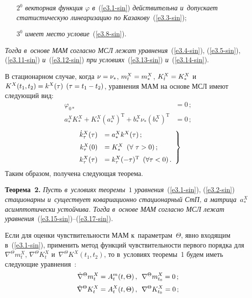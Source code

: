 \begin{multicols}{2}
\begin{itemize}
\item[$2^0$] \textit{векторная функция $\varphi$ в}~(\ref{e3.1-sin}) 
\textit{действительна и~допускает статистическую линеаризацию по 
Казакову}~(\ref{e3.3-sin});

\item[$3^0$] \textit{имеет место условие}~(\ref{e3.8-sin}).
\end{itemize}

\textit{Тогда в~основе МАМ согласно МСЛ лежат уравнения}~(\ref{e3.4-sin}), 
(\ref{e3.5-sin}), (\ref{e3.11-sin}) \textit{и}~(\ref{e3.12-sin}) 
\textit{при условиях}~(\ref{e3.13-sin}) \textit{и}~(\ref{e3.14-sin}).

\smallskip

В стационарном случае, когда $\nu \hm= \nu_*$, $m_t^X\hm= m_*^X$, $K_t^X\hm=K_*^X$ 
и~$K^X(t_1, t_2) \hm= k^X (\tau)$ $(\tau \hm= t_1\hm- t_2)$, уравнения МАМ 
на основе МСЛ имеют следующий вид:
  \begin{align}
  \varphi_{0*} &=0\,;\label{e3.15-sin}\\
    a_*^X K_*^X + K_*^X \left(a_*^X\right)^{\mathrm{T}} + b_*^X \nu_* 
    \left(b_*^X\right)^{\mathrm{T}} &=0\,;
    \label{e3.16-sin}
    \end{align}
    \begin{equation}
    \left.
    \begin{array}{rl}
    \dot k^X_\tau (\tau) &= a_*^X k^X(\tau)\,;\\[6pt] 
    k^X_\tau (0) &= K^X_* \enskip(\forall\ \tau >0)\,;\\[6pt] 
    k_\tau^X(\tau) &= k_\tau^X (-\tau)^{\mathrm{T}} \enskip 
    (\forall \tau <0)\,.
    \end{array}
    \right\}
    \label{e3.17-sin}
\end{equation}
Таким образом, получена следующая теорема.

\smallskip

\noindent
\textbf{Теорема~2.} \textit{Пусть в~условиях теоремы~$1$ 
уравнения}~(\ref{e3.1-sin}), (\ref{e3.2-sin}) 
\textit{стационарны и~существует ковариационно стационарный СтП, а матрица~$a_*^X$ 
асимптотически устойчива. Тогда в~основе МАМ согласно МСЛ лежат 
уравнения}~(\ref{e3.15-sin})--(\ref{e3.17-sin}).


\smallskip

Если для оценки чувствительности МАМ к~параметрам~$\Theta$, явно входящим в~(\ref{e3.1-sin}), 
применить метод функций чувствительности первого порядка для $\nabla^\Theta m_t^X$, 
$\nabla^\Theta K_t^X$ и~$\nabla^\Theta K^X (t_1, t_2)$, то в~условиях теоремы~1 
будем иметь следующие уравнения~\cite{8-sin}:
   \begin{gather}
   \dot \nabla^\Theta m_t^X = A_t^m (t,\Theta)\,,\enskip 
    \nabla^\Theta m_{t_0}^X =0\,;\label{e3.18-sin}\\[2pt]
    \dot \nabla^\Theta K_t^X = A_t^X (t,\Theta)\,,\enskip 
    \nabla^\Theta K_{t_0}^X =0\,;\label{e3.19-sin}
    \end{gather}
    

\end{multicols}
